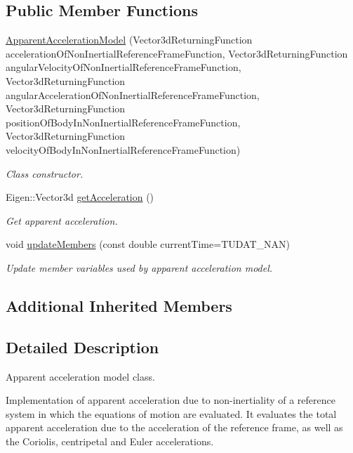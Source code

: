 \subsection*{Public Member Functions}
\begin{DoxyCompactItemize}
\item 
\hyperlink{classtudat_1_1reference__frames_1_1ApparentAccelerationModel_ae3f56489f99050ec73f5b22631e69fe5}{Apparent\+Acceleration\+Model} (Vector3d\+Returning\+Function acceleration\+Of\+Non\+Inertial\+Reference\+Frame\+Function, Vector3d\+Returning\+Function angular\+Velocity\+Of\+Non\+Inertial\+Reference\+Frame\+Function, Vector3d\+Returning\+Function angular\+Acceleration\+Of\+Non\+Inertial\+Reference\+Frame\+Function, Vector3d\+Returning\+Function position\+Of\+Body\+In\+Non\+Inertial\+Reference\+Frame\+Function, Vector3d\+Returning\+Function velocity\+Of\+Body\+In\+Non\+Inertial\+Reference\+Frame\+Function)
\begin{DoxyCompactList}\small\item\em Class constructor. \end{DoxyCompactList}\item 
Eigen\+::\+Vector3d \hyperlink{classtudat_1_1reference__frames_1_1ApparentAccelerationModel_aa5c72a891752917421efb970407b2517}{get\+Acceleration} ()
\begin{DoxyCompactList}\small\item\em Get apparent acceleration. \end{DoxyCompactList}\item 
void \hyperlink{classtudat_1_1reference__frames_1_1ApparentAccelerationModel_ae3704bca478d47f8ceb8888a58df5ad9}{update\+Members} (const double current\+Time=T\+U\+D\+A\+T\+\_\+\+N\+AN)
\begin{DoxyCompactList}\small\item\em Update member variables used by apparent acceleration model. \end{DoxyCompactList}\end{DoxyCompactItemize}
\subsection*{Additional Inherited Members}


\subsection{Detailed Description}
Apparent acceleration model class. 

Implementation of apparent acceleration due to non-\/inertiality of a reference system in which the equations of motion are evaluated. It evaluates the total apparent acceleration due to the acceleration of the reference frame, as well as the Coriolis, centripetal and Euler accelerations. 

